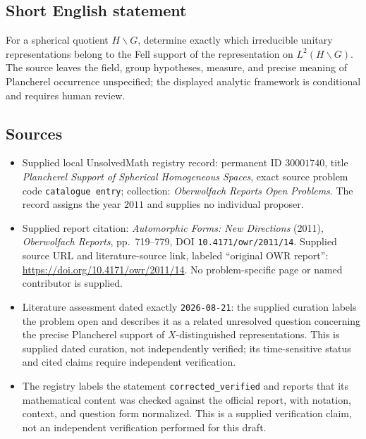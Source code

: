 \documentclass[11pt]{article}
\begin{document}
\subsection{Short English statement}
For a spherical quotient \(H\backslash G\), determine exactly which irreducible unitary representations belong to the Fell support of the representation on \(L^2(H\backslash G)\). The source leaves the field, group hypotheses, measure, and precise meaning of Plancherel occurrence unspecified; the displayed analytic framework is conditional and requires human review.
\subsection{Sources}
\begin{itemize}
\item Supplied local UnsolvedMath registry record: permanent ID \(30001740\), title \emph{Plancherel Support of Spherical Homogeneous Spaces}, exact source problem code \texttt{catalogue entry}; collection: \emph{Oberwolfach Reports Open Problems}. The record assigns the year \(2011\) and supplies no individual proposer.
\item Supplied report citation: \emph{Automorphic Forms: New Directions} (2011), \emph{Oberwolfach Reports}, pp.~719--779, DOI \texttt{10.4171/owr/2011/14}. Supplied source URL and literature-source link, labeled ``original OWR report'': \url{https://doi.org/10.4171/owr/2011/14}. No problem-specific page or named contributor is supplied.
\item Literature assessment dated exactly \texttt{2026-08-21}: the supplied curation labels the problem open and describes it as a related unresolved question concerning the precise Plancherel support of \(X\)-distinguished representations. This is supplied dated curation, not independently verified; its time-sensitive status and cited claims require independent verification.
\item The registry labels the statement \texttt{corrected\_verified} and reports that its mathematical content was checked against the official report, with notation, context, and question form normalized. This is a supplied verification claim, not an independent verification performed for this draft.
\end{itemize}
\end{document}
